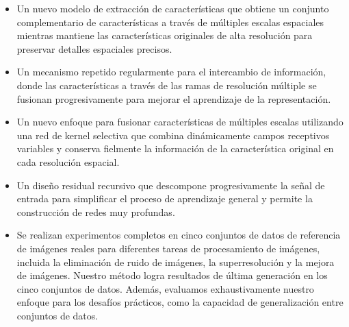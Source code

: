 \documentclass[a4paper,
               ]{jacow}
\begin{document}
\begin{itemize}[label=-]
  \item Un nuevo modelo de extracción de características que obtiene un conjunto complementario de características a través de múltiples escalas espaciales mientras mantiene las características originales de alta resolución para preservar detalles espaciales precisos.
  \item Un mecanismo repetido regularmente para el intercambio de información, donde las características a través de las ramas de resolución múltiple se fusionan progresivamente para mejorar el aprendizaje de la representación.
  \item Un nuevo enfoque para fusionar características de múltiples escalas utilizando una red de kernel selectiva que combina dinámicamente campos receptivos variables y conserva fielmente la información de la característica original en cada resolución espacial.
  \item Un diseño residual recursivo que descompone progresivamente la señal de entrada para simplificar el proceso de aprendizaje general y permite la construcción de redes muy profundas.
  \item Se realizan experimentos completos en cinco conjuntos de datos de referencia de imágenes reales para diferentes tareas de procesamiento de imágenes, incluida la eliminación de ruido de imágenes, la superresolución y la mejora de imágenes. Nuestro método logra resultados de última generación en los cinco conjuntos de datos. Además, evaluamos exhaustivamente nuestro enfoque para los desafíos prácticos, como la capacidad de generalización entre conjuntos de datos.
\end{itemize}
\end{document}
